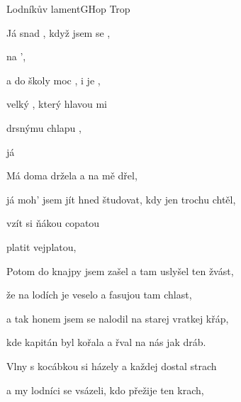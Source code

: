 \setcounter{page}{46}
\begin{song}{Lodníkův lament}{G}{Hop Trop}

\begin{SBVerse}

Já snad , když jsem se ,

na   ',

a do školy moc , i  je  ,

velký , který hlavou mi  

drsnýmu chlapu ,

já  


\end{SBVerse}

\begin{SBChorus}

Má doma držela a  na mě dřel,

já moh' jsem jít hned študovat, kdy jen trochu chtěl,

 vzít si ňákou  copatou

 platit  vejplatou,  

\end{SBChorus}

\begin{SBVerse}

Potom do knajpy jsem zašel a tam uslyšel ten žvást,

že na lodích je veselo a fasujou tam chlast,

a tak honem jsem se nalodil na starej vratkej křáp,

kde kapitán byl kořala a řval na nás jak dráb.

\end{SBVerse}

\begin{SBChorus}

\end{SBChorus}

\begin{SBVerse}

Vlny s kocábkou si házely a každej dostal strach

a my lodníci se vsázeli, kdo přežije ten krach,


\end{SBVerse}
\end{song}
